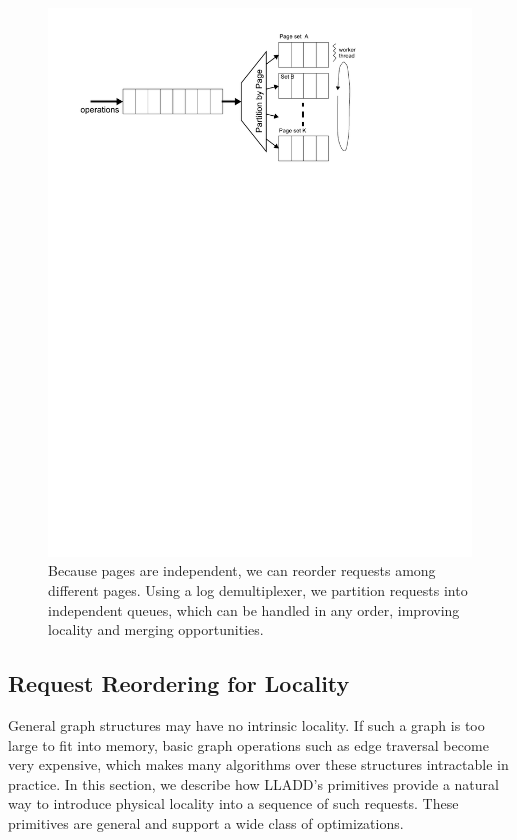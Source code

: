 \documentclass[10pt,letterpaper,twocolumn,english]{article}
\newcommand{\yad}{LLADD\xspace}
\begin{document}
\begin{figure}
\includegraphics[width=1\columnwidth]{../paper2/graph-traversal.pdf}
\vspace{-24pt}
\caption{\sf\label{fig:multiplexor} Because pages are independent, we
can reorder requests among different pages. Using a log demultiplexer,
we partition requests into independent queues, which can be 
handled in any order, improving locality and merging opportunities.}
\end{figure}

\subsection {Request Reordering for Locality}

General graph structures may have no intrinsic locality.  If such a
graph is too large to fit into memory, basic graph operations such as
edge traversal become very expensive, which makes many algorithms over
these structures intractable in practice.  In this section, we
describe how \yad's primitives provide a natural way to introduce
physical locality into a sequence of such requests.  These primitives
are general and support a wide class of optimizations.
\end{document}
